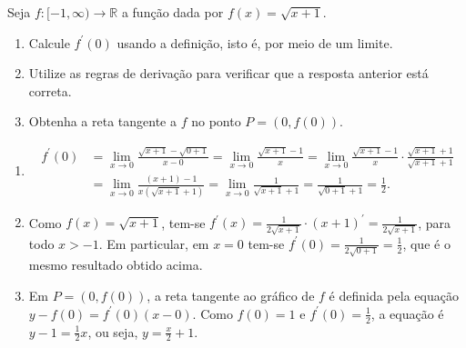 \documentclass[12pt,a4paper]{article}
\newcommand*\R{\mathbb{R}}
\begin{document}
\begin{ExerciseList}
\Exercise[title={2,5}] Seja $f: [-1, \infty) \to \R$ a função dada por $f(x) = \sqrt{x+1}$.
\begin{enumerate}
\item Calcule $f^\prime(0)$ usando a definição, isto é, por meio de um limite.
\item Utilize as regras de derivação para verificar que a resposta anterior está correta.
\item Obtenha a reta tangente a $f$ no ponto $P = (0, f(0))$.
\end{enumerate}

\Answer
\begin{enumerate}
\item
\begin{align*}
f^\prime(0)
& = \lim_{x \to 0} \frac{\sqrt{x+1} -\sqrt{0+1}}{x-0}
= \lim_{x \to 0} \frac{\sqrt{x+1} - 1}{x}
= \lim_{x \to 0} \frac{\sqrt{x+1} - 1}{x} \cdot \frac{\sqrt{x+1} + 1}{\sqrt{x+1} + 1} \\
& = \lim_{x \to 0} \frac{(x+1) - 1}{x (\sqrt{x+1} + 1)}
= \lim_{x \to 0} \frac{1}{\sqrt{x+1} + 1}
= \frac{1}{\sqrt{0+1} + 1}
= \frac{1}{2}.
\end{align*}
\item Como $f(x) = \sqrt{x+1}$, tem-se $f^\prime(x) = \frac{1}{2\sqrt{x+1}} \cdot (x+1)^\prime = \frac{1}{2\sqrt{x+1}}$, para todo $x > -1$. Em particular, em $x = 0$ tem-se $f^\prime(0) = \frac{1}{2 \sqrt{0+1}} = \frac{1}{2}$, que é o mesmo resultado obtido acima.
\item Em $P = (0, f(0))$, a reta tangente ao gráfico de $f$ é definida pela equação $y - f(0) = f^\prime(0) (x-0)$. Como $f(0) = 1$ e $f^\prime(0) = \frac{1}{2}$, a equação é $y - 1 = \frac{1}{2}x$, ou seja, $y = \frac{x}{2} + 1$.
\end{enumerate}


\end{ExerciseList}
\end{document}
